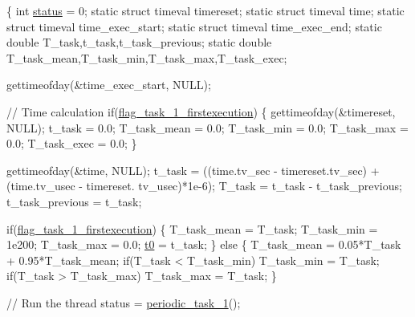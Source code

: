 \begin{DoxyCode}
\{
    \textcolor{keywordtype}{int} \hyperlink{communication_01_07C_xC3_xB3pia_01em_01conflito_01de_01Andr_xC3_xA9_01Carvalho_012013-04-26_08_8c_a6e27f49150e9a14580fb313cc2777e00}{status} = 0;
    \textcolor{keyword}{static} \textcolor{keyword}{struct }timeval timereset;
    \textcolor{keyword}{static} \textcolor{keyword}{struct }timeval time;
    \textcolor{keyword}{static} \textcolor{keyword}{struct }timeval time\_exec\_start;
    \textcolor{keyword}{static} \textcolor{keyword}{struct }timeval time\_exec\_end;
    \textcolor{keyword}{static} \textcolor{keywordtype}{double} T\_task,t\_task,t\_task\_previous;
    \textcolor{keyword}{static} \textcolor{keywordtype}{double} T\_task\_mean,T\_task\_min,T\_task\_max,T\_task\_exec;

    gettimeofday(&time\_exec\_start, NULL);

    \textcolor{comment}{// Time calculation}
    \textcolor{keywordflow}{if}(\hyperlink{main2_01_07C_xC3_xB3pia_01em_01conflito_01de_01Caio_01Gustavo_01Mesquita_01Angelo_012013-04-28_08_8c_a764ebf75ba887a9ecf7bf8fe124960e0}{flag\_task\_1\_firstexecution})
    \{
        gettimeofday(&timereset, NULL);
        t\_task = 0.0;
        T\_task\_mean = 0.0;
        T\_task\_min = 0.0;
        T\_task\_max = 0.0;
        T\_task\_exec = 0.0;
    \}

    gettimeofday(&time, NULL);
    t\_task = ((time.tv\_sec - timereset.tv\_sec) + (time.tv\_usec - timereset.
      tv\_usec)*1e-6);
    T\_task = t\_task - t\_task\_previous;
    t\_task\_previous = t\_task;

    \textcolor{keywordflow}{if}(\hyperlink{main2_01_07C_xC3_xB3pia_01em_01conflito_01de_01Caio_01Gustavo_01Mesquita_01Angelo_012013-04-28_08_8c_a764ebf75ba887a9ecf7bf8fe124960e0}{flag\_task\_1\_firstexecution})
    \{
        T\_task\_mean = T\_task;
        T\_task\_min  = 1e200;
        T\_task\_max  = 0.0;
        \hyperlink{main2_01_07C_xC3_xB3pia_01em_01conflito_01de_01Caio_01Gustavo_01Mesquita_01Angelo_012013-04-28_08_8c_a86c2efd6da48b362806cdbb5b1e711d8}{t0} = t\_task;
    \}
    \textcolor{keywordflow}{else}
    \{
        T\_task\_mean = 0.05*T\_task + 0.95*T\_task\_mean;
        \textcolor{keywordflow}{if}(T\_task < T\_task\_min) T\_task\_min  = T\_task;
        \textcolor{keywordflow}{if}(T\_task > T\_task\_max) T\_task\_max  = T\_task;
    \}

    \textcolor{comment}{// Run the thread}
    status = \hyperlink{main_01_07C_xC3_xB3pia_01em_01conflito_01de_01Caio_01Gustavo_01Mesquita_01Angelo_012013-04-28_08_8c_a26855b7739897854265d51aa61329390}{periodic\_task\_1}();


\end{DoxyCode}
